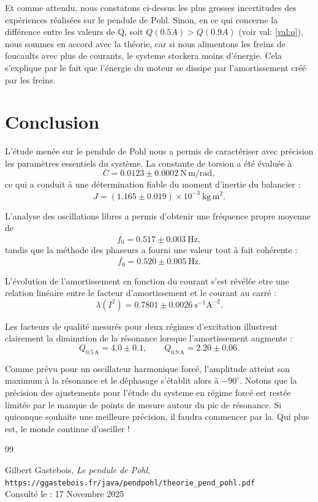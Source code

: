 Et comme attendu, nous constatons ci-dessus les plus grosses incertitudes des expériences réalisées sur le pendule de Pohl. Sinon, en ce qui concerne la différence entre les valeurs de Q, soit $Q\!\left(0.5A\right) > Q\!\left(0.9A\right)$  (voir val: \ref{val:q}), nous sommes en accord avec la théorie, car si nous alimentons les freins de foucaults avec plus de courants, le systeme stockera moins d'énergie. Cela s'explique par le fait que l'énergie du moteur se dissipe par l'amortissement créé par les freins.


\section{Conclusion}

L’étude menée sur le pendule de Pohl nous a permis de caractériser avec précision les paramètres essentiels du système. 
La constante de torsion a été évaluée à 
\[
C = 0.0123 \pm 0.0002~\mathrm{N\,m/rad},
\]
ce qui a conduit à une détermination fiable du moment d’inertie du balancier :
\[
J = (1.165 \pm 0.019)\times 10^{-3}~\mathrm{kg\,m^2}.
\]

L’analyse des oscillations libres a permis d’obtenir une fréquence propre moyenne de
\[
\overline{f_0} = 0.517 \pm 0.003~\mathrm{Hz},
\]
tandis que la méthode des phaseurs a fourni une valeur tout à fait cohérente :
\[
	\overline{f_0} = 0.520 \pm 0.005~\mathrm{Hz}.
\]

L’évolution de l’amortissement en fonction du courant s’est révélée etre une relation linéaire entre le facteur d'amortissement et le courant au carré :
\[
\lambda(I^2) = 0.7801 \pm 0.0026~\mathrm{s^{-1}A^{-2}}.
\]

Les facteurs de qualité mesurés pour deux régimes d’excitation illustrent clairement la diminution de la résonance lorsque l’amortissement augmente :
\[
Q_{0.5\,\mathrm{A}} = 4.0 \pm 0.1, \qquad
Q_{0.9\,\mathrm{A}} = 2.20 \pm 0.06.
\]

Comme prévu pour un oscillateur harmonique forcé, l’amplitude atteint son maximum à la résonance et le déphasage s’établit alors à $-90^\circ$. 
Notons que la précision des ajustements pour l'étude du systeme en régime forcé est restée limitée par le manque de points de mesure autour du pic de résonance. Si quiconque souhaite une meilleure précision, il faudra commencer par la. Qui plus est, le monde continue d'osciller !
\begin{thebibliography}{99}

Gilbert Gastebois, \textit{Le pendule de Pohl},
\\
\texttt{https://ggastebois.fr/java/pendpohl/theorie\_pend\_pohl.pdf}
\\
Consulté le : 17 Novembre 2025

\end{thebibliography}

